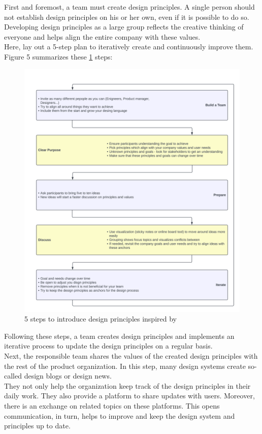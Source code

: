 First and foremost, a team must create design principles. A single person should not establish design principles on his or her own, even if it is possible to do so. Developing design principles as a large group reflects the creative thinking of everyone and helps align the entire company with these values. \\
Here, \citet{vesselov_building_2019} lay out a 5-step plan to iteratively create and continuously improve them. Figure 5 summarizes these  \ref{design_principles_steps} steps:
\newpage


\begin{figure}[htbp]
\centerline{\includegraphics[width=\linewidth]{images/design_principles_steps.png}}
\caption{5 steps to introduce design principles inspired by  \citet{vesselov_building_2019}}
\label{design_principles_steps}
\end{figure}
Following these steps, a team creates design principles and implements an iterative process to update the design principles on a regular basis. \\
Next, the responsible team shares the values of the created design principles with the rest of the product organization. In this step, many design systems create so-called design blogs or design news. \\
They not only help the organization keep track of the design principles in their daily work. They also provide a platform to share updates with users. Moreover, there is an exchange on related topics on these platforms. This opens communication, in turn, helps to improve and keep the design system and principles up to date.  \cite{google_material_2022} \\

